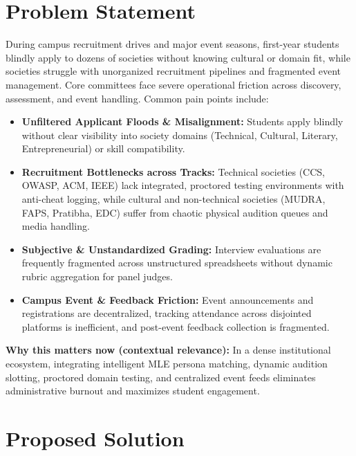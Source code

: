 \documentclass[11pt,a4paper]{article}
\begin{document}
\section{Problem Statement}
During campus recruitment drives and major event seasons, first-year students blindly apply to dozens of societies without knowing cultural or domain fit, while societies struggle with unorganized recruitment pipelines and fragmented event management. Core committees face severe operational friction across discovery, assessment, and event handling. Common pain points include:
\begin{itemize}[leftmargin=0.7cm]
    \item \textbf{Unfiltered Applicant Floods \& Misalignment:} Students apply blindly without clear visibility into society domains (Technical, Cultural, Literary, Entrepreneurial) or skill compatibility.
    \item \textbf{Recruitment Bottlenecks across Tracks:} Technical societies (CCS, OWASP, ACM, IEEE) lack integrated, proctored testing environments with anti-cheat logging, while cultural and non-technical societies (MUDRA, FAPS, Pratibha, EDC) suffer from chaotic physical audition queues and media handling.
    \item \textbf{Subjective \& Unstandardized Grading:} Interview evaluations are frequently fragmented across unstructured spreadsheets without dynamic rubric aggregation for panel judges.
    \item \textbf{Campus Event \& Feedback Friction:} Event announcements and registrations are decentralized, tracking attendance across disjointed platforms is inefficient, and post-event feedback collection is fragmented.
\end{itemize}

\textbf{Why this matters now (contextual relevance):} In a dense institutional ecosystem, integrating intelligent MLE persona matching, dynamic audition slotting, proctored domain testing, and centralized event feeds eliminates administrative burnout and maximizes student engagement.

\section{Proposed Solution}
\end{document}
